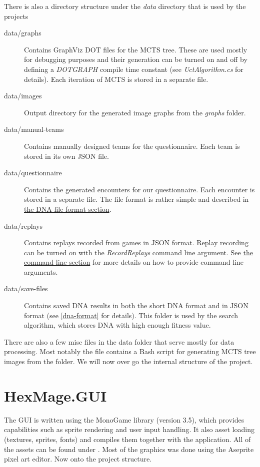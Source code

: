 There is also a directory structure under the \emph{data} directory that is used by the projects

\begin{description}
	\item[data/graphs] Contains GraphViz DOT \citep{graphviz} files for the MCTS tree. These are used mostly for debugging purposes and their generation can be turned on and off by defining a \emph{DOTGRAPH} compile time constant (see \emph{UctAlgorithm.cs} for details). Each iteration of MCTS is stored in a separate file.
	\item[data/images] Output directory for the generated image graphs from the \emph{graphs} folder.
	\item[data/manual-teams] Contains manually designed teams for the questionnaire. Each team is stored in its own JSON \citep{json} file.
	\item[data/questionnaire] Contains the generated encounters for our questionnaire. Each encounter is stored
	in a separate file. The file format is rather simple and described in \hyperref[dna-format]{the DNA file format section}.
	\item[data/replays] Contains replays recorded from games in JSON format. Replay recording can be turned on with the \emph{RecordReplays} command line argument. See \hyperref[cmd-args]{the command line section} for more details on how to provide command line arguments.
	\item[data/save-files] Contains saved DNA results in both the short DNA format and in JSON format (see \autoref{dna-format} for details). This folder is used by the search algorithm, which stores DNA with high enough fitness value.
\end{description}

There are also a few misc files in the data folder that serve mostly for data processing. Most notably the  file contains a Bash \citep{bash} script for generating MCTS tree images from the  folder. We will now over go the internal structure of the project.

\section{HexMage.GUI}

The GUI is written using the MonoGame \citep{monogame} library (version 3.5), which provides capabilities such as sprite rendering and user input handling. It also asset loading (textures, sprites, fonts) and compiles them together with the application. All of the assets can be found under . Most of the graphics was done using the Aseprite \citep{aseprite} pixel art editor. Now onto the project structure.

